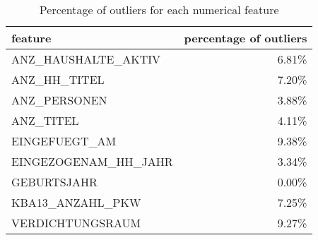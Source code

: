 \begin{table}[H]
\centering
\caption{Percentage of outliers for each numerical feature}
\label{tab:outlier-percent}
\begin{tabular}{lr}
\toprule
feature & percentage of outliers \\
\midrule
ANZ\_HAUSHALTE\_AKTIV & 6.81\% \\
ANZ\_HH\_TITEL & 7.20\% \\
ANZ\_PERSONEN & 3.88\% \\
ANZ\_TITEL & 4.11\% \\
EINGEFUEGT\_AM & 9.38\% \\
EINGEZOGENAM\_HH\_JAHR & 3.34\% \\
GEBURTSJAHR & 0.00\% \\
KBA13\_ANZAHL\_PKW & 7.25\% \\
VERDICHTUNGSRAUM & 9.27\% \\
\bottomrule
\end{tabular}
\end{table}
